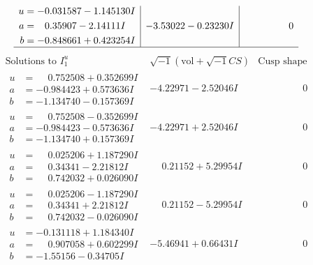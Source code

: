 \documentclass[1p]{elsarticle_modified}
\theoremstyle{definition}
\newcommand{\I}{\sqrt{-1}}
\begin{document}
$$\begin{array}{c|c|c}
\begin{aligned}
u &= -0.031587 - 1.145130 I \\
a &= \phantom{-}0.35907 - 2.14111 I \\
b &= -0.848661 + 0.423254 I\end{aligned}
 & -3.53022 - 0.23230 I & \phantom{-0.000000 } 0\\
 \hline 
 \end{array}$$\newpage$$\begin{array}{c|c|c}  
\text{Solutions to }I^u_{1}& \I (\text{vol} + \sqrt{-1}CS) & \text{Cusp shape}\\
 \hline 
\begin{aligned}
u &= \phantom{-}0.752508 + 0.352699 I \\
a &= -0.984423 + 0.573636 I \\
b &= -1.134740 - 0.157369 I\end{aligned}
 & -4.22971 - 2.52046 I & \phantom{-0.000000 } 0 \\ \hline\begin{aligned}
u &= \phantom{-}0.752508 - 0.352699 I \\
a &= -0.984423 - 0.573636 I \\
b &= -1.134740 + 0.157369 I\end{aligned}
 & -4.22971 + 2.52046 I & \phantom{-0.000000 } 0 \\ \hline\begin{aligned}
u &= \phantom{-}0.025206 + 1.187290 I \\
a &= \phantom{-}0.34341 - 2.21812 I \\
b &= \phantom{-}0.742032 + 0.026090 I\end{aligned}
 & \phantom{-}0.21152 + 5.29954 I & \phantom{-0.000000 } 0 \\ \hline\begin{aligned}
u &= \phantom{-}0.025206 - 1.187290 I \\
a &= \phantom{-}0.34341 + 2.21812 I \\
b &= \phantom{-}0.742032 - 0.026090 I\end{aligned}
 & \phantom{-}0.21152 - 5.29954 I & \phantom{-0.000000 } 0 \\ \hline\begin{aligned}
u &= -0.131118 + 1.184340 I \\
a &= \phantom{-}0.907058 + 0.602299 I \\
b &= -1.55156 - 0.34705 I\end{aligned}
 & -5.46941 + 0.66431 I & \phantom{-0.000000 } 0 \\ \hline\begin{aligned}

\end{aligned}
\end{array}$$
\end{document}
